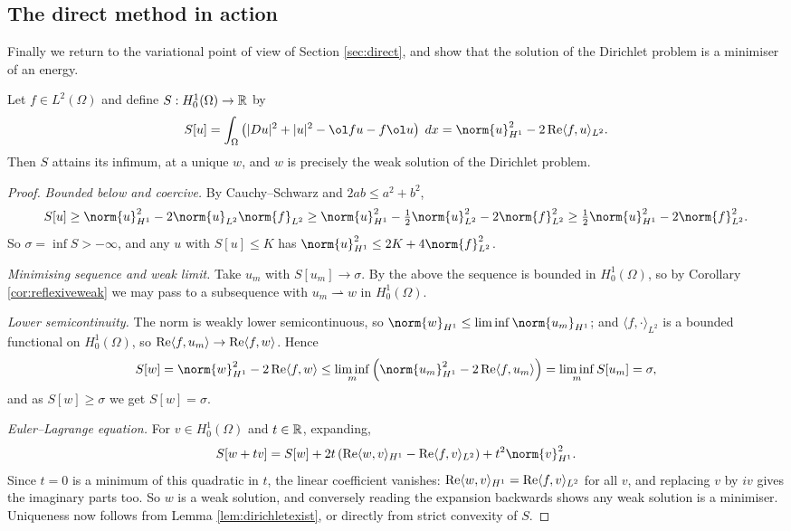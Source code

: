 \documentclass[a4paper]{scrartcl}
\newcommand{\ip}[2]{\langle #1, #2 \rangle}
\newcommand{\weakto}{\rightharpoonup}
\begin{document}
\subsection{The direct method in action}

Finally we return to the variational point of view of Section \ref{sec:direct}, and show that the solution of the Dirichlet problem is a minimiser of an energy.

\begin{proposition}\label{prop:dirichletmin}
	Let $f \in L^2(\Omega)$ and define $S : H_0^1(\Omega)\to\mathbb{R}$ by
	$$S[u]=\int_\Omega\left(|Du|^2+|u|^2-\ol fu-f\ol u\right)\dd x = \norm{u}^2_{H^1}-2\re\ip{f}{u}_{L^2}.$$
	Then $S$ attains its infimum, at a unique $w$, and $w$ is precisely the weak solution of the Dirichlet problem.
\end{proposition}

\begin{proof}
	\emph{Bounded below and coercive.} By Cauchy--Schwarz and $2ab \le a^2 + b^2$,
	$$S[u]\ge\norm{u}^2_{H^1}-2\norm{u}_{L^2}\norm{f}_{L^2}\ge\norm{u}^2_{H^1}-\tfrac12\norm{u}^2_{L^2}-2\norm{f}^2_{L^2}\ge\tfrac12\norm{u}^2_{H^1}-2\norm{f}^2_{L^2}.$$
	So $\sigma = \inf S > -\infty$, and any $u$ with $S[u]\le K$ has $\norm{u}^2_{H^1}\le2K+4\norm{f}^2_{L^2}$.

	\emph{Minimising sequence and weak limit.} Take $u_m$ with $S[u_m]\to\sigma$. By the above the sequence is bounded in $H_0^1(\Omega)$, so by Corollary \ref{cor:reflexiveweak} we may pass to a subsequence with $u_m\weakto w$ in $H_0^1(\Omega)$.

	\emph{Lower semicontinuity.} The norm is weakly lower semicontinuous, so $\norm{w}_{H^1}\le\liminf\norm{u_m}_{H^1}$; and $\ip{f}{\cdot}_{L^2}$ is a bounded functional on $H_0^1(\Omega)$, so $\re\ip{f}{u_m}\to\re\ip{f}{w}$. Hence
	$$S[w]=\norm{w}^2_{H^1}-2\re\ip{f}{w}\le\liminf_m\left(\norm{u_m}^2_{H^1}-2\re\ip{f}{u_m}\right)=\liminf_mS[u_m]=\sigma,$$
	and as $S[w]\ge\sigma$ we get $S[w]=\sigma$.

	\emph{Euler--Lagrange equation.} For $v \in H_0^1(\Omega)$ and $t \in \mathbb{R}$, expanding,
	$$S[w+tv]=S[w]+2t\left(\re\ip{w}{v}_{H^1}-\re\ip{f}{v}_{L^2}\right)+t^2\norm{v}^2_{H^1}.$$
	Since $t = 0$ is a minimum of this quadratic in $t$, the linear coefficient vanishes: $\re\ip{w}{v}_{H^1}=\re\ip{f}{v}_{L^2}$ for all $v$, and replacing $v$ by $iv$ gives the imaginary parts too. So $w$ is a weak solution, and conversely reading the expansion backwards shows any weak solution is a minimiser. Uniqueness now follows from Lemma \ref{lem:dirichletexist}, or directly from strict convexity of $S$.
\end{proof}
\end{document}
